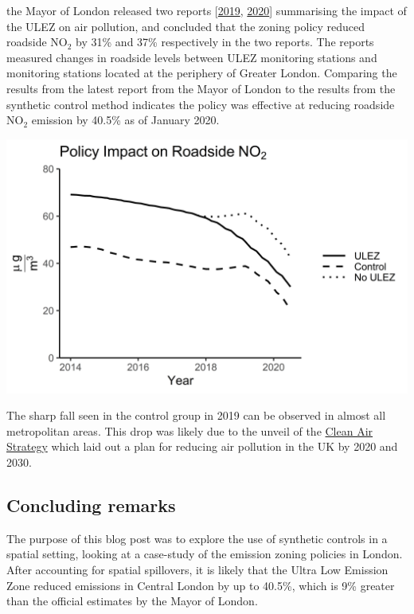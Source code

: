 \documentclass[
]{article}
\begin{document}
the Mayor of London released two reports
{[}\href{https://www.london.gov.uk/sites/default/files/ulez_six_month_evaluation_report_final_oct.pdf}{2019},
\href{https://www.london.gov.uk/sites/default/files/ulez_ten_month_evaluation_report_23_april_2020.pdf}{2020}{]}
summarising the impact of the ULEZ on air pollution, and concluded that
the zoning policy reduced roadside NO\(_2\) by 31\% and 37\%
respectively in the two reports. The reports measured changes in
roadside levels between ULEZ monitoring stations and monitoring stations
located at the periphery of Greater London. Comparing the results from
the latest report from the Mayor of London to the results from the
synthetic control method indicates the policy was effective at reducing
roadside NO\(_2\) emission by 40.5\% as of January 2020.

\includegraphics{NO2_DiD.png}

The sharp fall seen in the control group in 2019 can be observed in
almost all metropolitan areas. This drop was likely due to the unveil of
the
\href{https://www.gov.uk/government/publications/clean-air-strategy-2019/clean-air-strategy-2019-executive-summary}{Clean
Air Strategy} which laid out a plan for reducing air pollution in the UK
by 2020 and 2030.

\hypertarget{concluding-remarks}{%
\subsection{Concluding remarks}\label{concluding-remarks}}

The purpose of this blog post was to explore the use of synthetic
controls in a spatial setting, looking at a case-study of the emission
zoning policies in London. After accounting for spatial spillovers, it
is likely that the Ultra Low Emission Zone reduced emissions in Central
London by up to 40.5\%, which is 9\% greater than the official estimates
by the Mayor of London.
\end{document}
